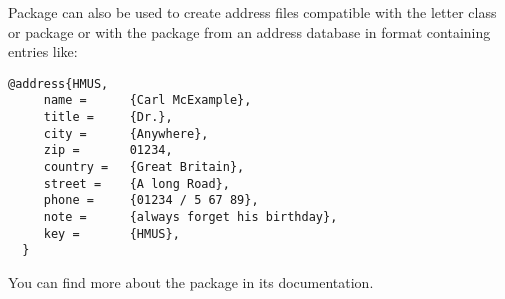 Package  can also be used to create
address files compatible with the \KOMAScript{} letter class or package or
with the  package from an address database in \BibTeX{}
format containing entries like:
\begin{lstlisting}[morekeywords={@address}]
  @address{HMUS,
     name =      {Carl McExample},
     title =     {Dr.},
     city =      {Anywhere},
     zip =       01234,
     country =   {Great Britain},
     street =    {A long Road},
     phone =     {01234 / 5 67 89},
     note =      {always forget his birthday},
     key =       {HMUS},
  }
\end{lstlisting}
You can find more about the  package in
its documentation.%
%
\EndIndexGroup
%
\EndIndexGroup
%
\EndIndexGroup

\endinput


